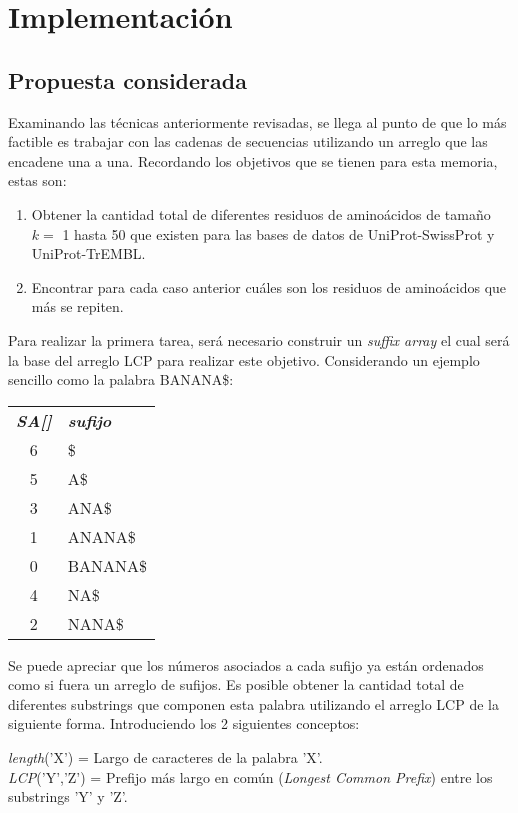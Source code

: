 \chapter{Implementación}

\section{Propuesta considerada}

Examinando las técnicas anteriormente revisadas, se llega al punto de que lo más factible es trabajar con las cadenas de secuencias utilizando un arreglo que las encadene una a una. Recordando los objetivos que se tienen para esta memoria, estas son:

\begin{enumerate}
\item Obtener la cantidad total de diferentes residuos de aminoácidos de tamaño $k =$ 1 hasta 50 que existen para las bases de datos de UniProt-SwissProt y UniProt-TrEMBL.
\item Encontrar para cada caso anterior cuáles son los residuos de aminoácidos que más se repiten.
\end{enumerate}

Para realizar la primera tarea, será necesario construir un \textit{suffix array} el cual será la base del arreglo LCP para realizar este objetivo. Considerando un ejemplo sencillo como la palabra BANANA\$:

\begin{table}[H]
	\centering
	\begin{tabular}{c l}
		\textit{\textbf{SA[]}} & \textit{\textbf{sufijo}}\\
		6 & \$\\
		5 & A\$\\
		3 & ANA\$\\
		1 & ANANA\$\\
		0 & BANANA\$\\
		4 & NA\$\\
		2 & NANA\$\\
	\end{tabular}
\end{table}

Se puede apreciar que los números asociados a cada sufijo ya están ordenados como si fuera un arreglo de sufijos. Es posible obtener la cantidad total de diferentes substrings que componen esta palabra utilizando el arreglo LCP de la siguiente forma. Introduciendo los 2 siguientes conceptos:

{\it{length}}('X') = Largo de caracteres de la palabra 'X'.\\
{\it{LCP}}('Y','Z') = Prefijo más largo en común ({\it{Longest Common Prefix}}) entre los substrings 'Y' y 'Z'.


